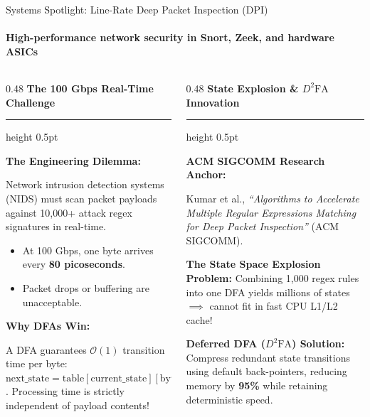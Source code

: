 \documentclass[aspectratio=169, 10pt]{beamer}
\newcommand{\colheader}[1]{%
  {\noindent\footnotesize\bfseries\color{gimpanavy}#1}%
  \vspace{0.02cm}%
  {\color{gimpanavy!30}\hrule height 0.5pt}%
  \vspace{0.05cm}%
}
\newcommand{\cardtitle}[1]{{\noindent\footnotesize\bfseries\color{gimpanavy}#1}\par\vspace{0.03cm}}
\newcommand{\alerttitle}[1]{{\noindent\footnotesize\bfseries\color{accentCrimson}#1}\par\vspace{0.03cm}}
\begin{document}
\begin{frame}{Systems Spotlight: Line-Rate Deep Packet Inspection (DPI)}
  \framesubtitle{High-performance network security in Snort, Zeek, and hardware ASICs}
  
  \begin{columns}[T]
    \begin{column}{0.48\textwidth}
      \colheader{The 100 Gbps Real-Time Challenge}
      \begin{tcolorbox}[conceptcard]
        \cardtitle{The Engineering Dilemma:}
        {\scriptsize
        Network intrusion detection systems (NIDS) must scan packet payloads against 10,000+ attack regex signatures in real-time.
        \begin{itemize}\setlength{\itemsep}{1.5pt}\scriptsize
          \item At 100 Gbps, one byte arrives every \textbf{80 picoseconds}.
          \item Packet drops or buffering are unacceptable.
        \end{itemize}
        }
        \vspace{0.04cm}
        
        \cardtitle{Why DFAs Win:}
        {\scriptsize
        A DFA guarantees $\mathcal{O}(1)$ transition time per byte:
        $\text{next\_state} = \text{table}[\text{current\_state}][\text{byte}]$.
        Processing time is strictly independent of payload contents!
        }
      \end{tcolorbox}
    \end{column}
    
    \begin{column}{0.48\textwidth}
      \colheader{State Explosion \& $D^2\text{FA}$ Innovation}
      \begin{tcolorbox}[spotlightcard]
        \alerttitle{ACM SIGCOMM Research Anchor:}
        {\scriptsize
        Kumar et al., \textit{``Algorithms to Accelerate Multiple Regular Expressions Matching for Deep Packet Inspection''} (ACM SIGCOMM).
        \vspace{0.04cm}
        
        \textbf{The State Space Explosion Problem:}
        Combining 1,000 regex rules into one DFA yields millions of states $\implies$ cannot fit in fast CPU L1/L2 cache!
        \vspace{0.04cm}
        
        \textbf{Deferred DFA ($D^2\text{FA}$) Solution:}
        Compress redundant state transitions using default back-pointers, reducing memory by \textbf{95\%} while retaining deterministic speed.
        }
      \end{tcolorbox}
    \end{column}
  \end{columns}
\end{frame}
\end{document}
